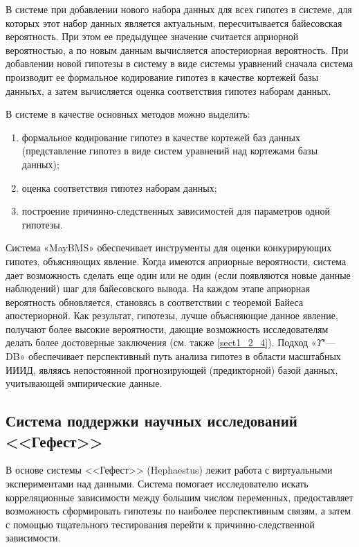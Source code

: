 В системе при добавлении нового набора данных для всех гипотез в системе, для которых этот набор данных является 
актуальным, пересчитывается байесовская вероятность. При этом ее предыдущее значение считается априорной вероятностью, 
а по новым данным вычисляется апостериорная вероятность. При добавлении новой гипотезы в систему в виде системы 
уравнений сначала система производит ее формальное кодирование гипотез в качестве кортежей базы данныъх, а затем 
вычисляется оценка соответствия гипотез наборам данных.

В системе в качестве основных методов можно выделить:
\begin{enumerate}
    \item формальное кодирование гипотез в качестве кортежей баз данных (представление гипотез в виде систем 
            уравнений над кортежами базы данных);
    \item оценка соответствия гипотез наборам данных;
    \item построение причинно-следственных зависимостей для параметров одной гипотезы.
\end{enumerate}

Система «MayBMS» обеспечивает инструменты для оценки конкурирующих гипотез, объясняющих явление. Когда имеются 
априорные вероятности, система дает возможность сделать еще один или не один (если появляются новые данные наблюдений) 
шаг для байесовского вывода. На каждом этапе априорная вероятность обновляется, становясь в соответствии с теоремой 
Байеса апостериорной. Как результат, гипотезы, лучше объясняющие данное явление, получают более высокие вероятности, 
дающие возможность исследователям делать более достоверные заключения (см. также \cref{sect1_2_4}). 
Подход «$\Upsilon$"---DB» обеспечивает перспективный путь анализа гипотез в области масштабных ИИИД, являясь 
непостоянной прогнозирующей (предикторной) базой данных, учитывающей эмпирические данные.


\subsection{Система поддержки научных исследований <<Гефест>>}\label{sect1_3_4}
В основе системы <<Гефест>> (Hephaestus) \cite{Duggan2015} лежит работа с виртуальными экспериментами над данными. Система помогает исследователю искать корреляционные зависимости между большим числом переменных, предоставляет возможность сформировать гипотезы по наиболее перспективным связям, а затем с помощью тщательного тестирования перейти к причинно-следственной зависимости. 

